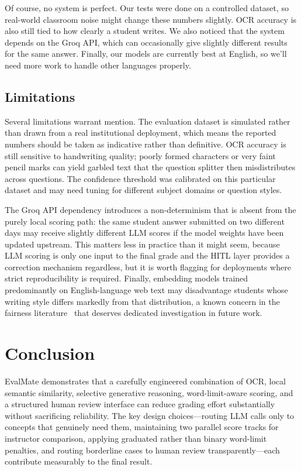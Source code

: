 \documentclass[conference]{IEEEtran}
\begin{document}
Of course, no system is perfect. Our tests were done on a controlled dataset, so real-world classroom noise might change these numbers slightly. OCR accuracy is also still tied to how clearly a student writes. We also noticed that the system depends on the Groq API, which can occasionally give slightly different results for the same answer. Finally, our models are currently best at English, so we'll need more work to handle other languages properly.

\subsection{Limitations}

Several limitations warrant mention. The evaluation dataset is
simulated rather than drawn from a real institutional deployment,
which means the reported numbers should be taken as indicative
rather than definitive. OCR accuracy is still sensitive to
handwriting quality; poorly formed characters or very faint
pencil marks can yield garbled text that the question splitter
then misdistributes across questions. The confidence threshold
was calibrated on this particular dataset and may need tuning
for different subject domains or question styles.

The Groq API dependency introduces a non-determinism that is
absent from the purely local scoring path: the same student
answer submitted on two different days may receive slightly
different LLM scores if the model weights have been updated
upstream. This matters less in practice than it might seem,
because LLM scoring is only one input to the final grade and the
HITL layer provides a correction mechanism regardless, but it is
worth flagging for deployments where strict reproducibility is
required. Finally, embedding models trained predominantly on
English-language web text may disadvantage students whose
writing style differs markedly from that distribution, a known
concern in the fairness literature~\cite{tristan2024} that
deserves dedicated investigation in future work.

\section{Conclusion}

EvalMate demonstrates that a carefully engineered combination of
OCR, local semantic similarity, selective generative reasoning,
word-limit-aware scoring, and a structured human review interface
can reduce grading effort substantially without sacrificing
reliability. The key design choices---routing LLM calls only to
concepts that genuinely need them, maintaining two parallel score
tracks for instructor comparison, applying graduated rather than
binary word-limit penalties, and routing borderline cases to human
review transparently---each contribute measurably to the final
result.
\end{document}
